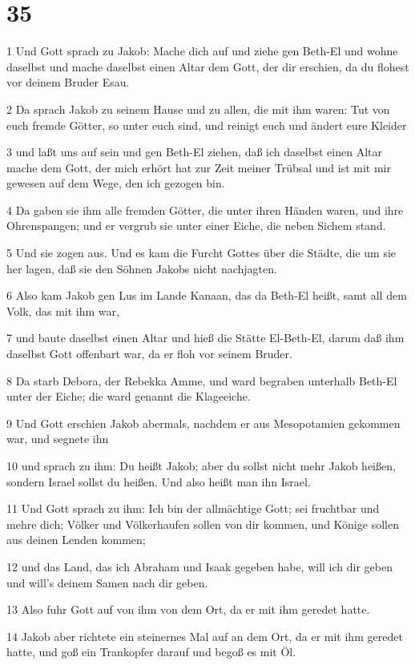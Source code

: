 \chapter{35}

\par 1 Und Gott sprach zu Jakob: Mache dich auf und ziehe gen Beth-El und wohne daselbst und mache daselbst einen Altar dem Gott, der dir erschien, da du flohest vor deinem Bruder Esau.
\par 2 Da sprach Jakob zu seinem Hause und zu allen, die mit ihm waren: Tut von euch fremde Götter, so unter euch sind, und reinigt euch und ändert eure Kleider
\par 3 und laßt uns auf sein und gen Beth-El ziehen, daß ich daselbst einen Altar mache dem Gott, der mich erhört hat zur Zeit meiner Trübsal und ist mit mir gewesen auf dem Wege, den ich gezogen bin.
\par 4 Da gaben sie ihm alle fremden Götter, die unter ihren Händen waren, und ihre Ohrenspangen; und er vergrub sie unter einer Eiche, die neben Sichem stand.
\par 5 Und sie zogen aus. Und es kam die Furcht Gottes über die Städte, die um sie her lagen, daß sie den Söhnen Jakobs nicht nachjagten.
\par 6 Also kam Jakob gen Lus im Lande Kanaan, das da Beth-El heißt, samt all dem Volk, das mit ihm war,
\par 7 und baute daselbst einen Altar und hieß die Stätte El-Beth-El, darum daß ihm daselbst Gott offenbart war, da er floh vor seinem Bruder.
\par 8 Da starb Debora, der Rebekka Amme, und ward begraben unterhalb Beth-El unter der Eiche; die ward genannt die Klageeiche.
\par 9 Und Gott erschien Jakob abermals, nachdem er aus Mesopotamien gekommen war, und segnete ihn
\par 10 und sprach zu ihm: Du heißt Jakob; aber du sollst nicht mehr Jakob heißen, sondern Israel sollst du heißen. Und also heißt man ihn Israel.
\par 11 Und Gott sprach zu ihm: Ich bin der allmächtige Gott; sei fruchtbar und mehre dich; Völker und Völkerhaufen sollen von dir kommen, und Könige sollen aus deinen Lenden kommen;
\par 12 und das Land, das ich Abraham und Isaak gegeben habe, will ich dir geben und will's deinem Samen nach dir geben.
\par 13 Also fuhr Gott auf von ihm von dem Ort, da er mit ihm geredet hatte.
\par 14 Jakob aber richtete ein steinernes Mal auf an dem Ort, da er mit ihm geredet hatte, und goß ein Trankopfer darauf und begoß es mit Öl.
